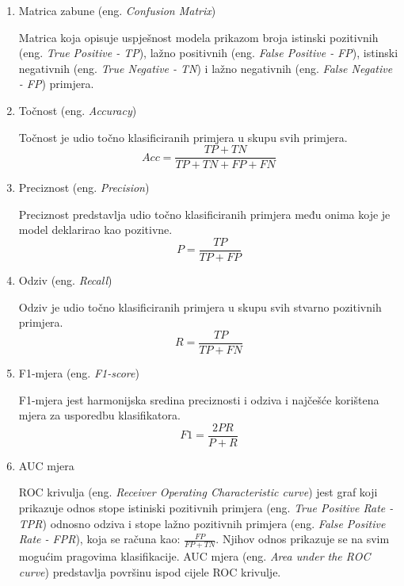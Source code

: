 \documentclass[utf8, diplomski, numeric]{fer}
\begin{document}
\begin{enumerate}
\item Matrica zabune (eng. \textit{Confusion Matrix})

Matrica koja opisuje uspješnost modela prikazom broja istinski pozitivnih (eng. \textit{True Positive - TP}), lažno positivnih (eng. \textit{False Positive - FP}), istinski negativnih (eng. \textit{True Negative - TN}) i lažno negativnih (eng.  \textit{False Negative - FP}) primjera.

\item Točnost (eng. \textit{Accuracy})

Točnost je udio točno klasificiranih primjera u skupu svih primjera.
\begin{equation*} \label{eq:accuracy}
Acc = \frac{TP+TN}{TP+TN+FP+FN}
\end{equation*}

\item Preciznost (eng. \textit{Precision})

Preciznost predstavlja udio točno klasificiranih primjera među onima koje je model deklarirao kao pozitivne.
\begin{equation*} \label{eq:precision}
P = \frac{TP}{TP+FP}
\end{equation*}

\item Odziv (eng. \textit{Recall})

Odziv je udio točno klasificiranih primjera u skupu svih stvarno pozitivnih primjera.
\begin{equation*} \label{eq:recall}
R = \frac{TP}{TP+FN}
\end{equation*}

\item F1-mjera (eng. \textit{F1-score})

F1-mjera jest harmonijska sredina preciznosti i odziva i najčešće korištena mjera za usporedbu klasifikatora.
\begin{equation*} \label{eq:f1}
F1 = \frac{2PR}{P+R}
\end{equation*}

\item AUC mjera

ROC krivulja (eng. \textit{Receiver Operating Characteristic curve}) jest graf koji prikazuje odnos stope istiniski pozitivnih primjera (eng. \textit{True Positive Rate - TPR}) odnosno odziva i stope lažno pozitivnih primjera (eng. \textit{False Positive Rate - FPR}), koja se računa kao: 
\begin{math}
\frac{FP}{FP+TN}
\end{math}. Njihov odnos prikazuje se na svim mogućim pragovima klasifikacije. AUC mjera (eng. \textit{Area under the ROC curve}) predstavlja površinu ispod cijele ROC krivulje.


\end{enumerate}
\end{document}

